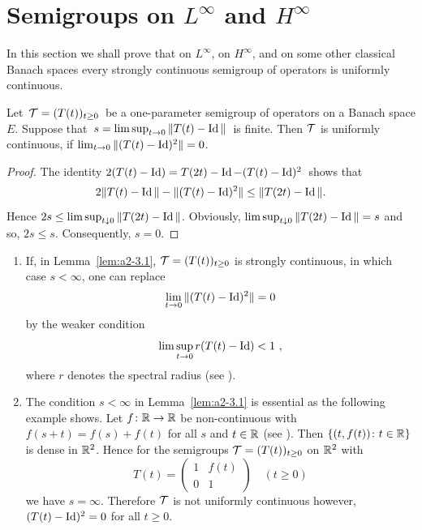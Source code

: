 \section{Semigroups on \texorpdfstring{$L^{\infty}$}{L-infty}  and \texorpdfstring{$H^{\infty}$}{H-infty} \label{sec:a2-3}}%
\hspace{1cm}{\Large by Heinrich P. Lotz}
\vspace{.5cm}
\newline
In this section we shall prove that on $L^\infty$, on $H^\infty$, and on some other classical Banach spaces every strongly continuous semigroup of operators is uniformly continuous.
\begin{lemma}\label{lem:a2-3.1}
Let\, $\TT = (T(t))_{t\geq 0}$\, be a one-parameter semigroup of operators on a Banach space $E$.
Suppose that\, $s = \lim\sup_{t\to 0} \|T(t) - \operatorname{Id}\|$\, is finite.
Then $\mathcal{T}$ is uniformly continuous, if\/ $\lim_{t\to 0} \|(T(t) - \operatorname{Id})^2\| = 0$.
\end{lemma}
\begin{proof}
The identity  $2(T(t) - \operatorname{Id}) = T(2t) - \operatorname{Id} - (T(t) - \operatorname{Id})^2$\, shows that
\[
	2\|T(t) - \Id\| - \|(T(t) - \Id)^{2} \| \leq \|T(2t) - \Id\| .
\]
Hence $2s \leq \lim \sup_{t \downarrow 0} \|T(2t) - \Id\|$.
Obviously, $\lim \sup_{t \downarrow 0} \|T(2t) - \operatorname{Id}\| = s$ and so, $2s \leq s$.
Consequently, $s = 0$.
\end{proof}
\begin{remarks*}\label{rem:a2-3.1-kgk}  
\begin{enumerate}[\upshape (i), wide, labelindent=.25em]
\item \label{rem:a2-3.1-kgk-1}
If, in Lemma~\ref{lem:a2-3.1}, $\TT = (T(t))_{t \geq 0}$ is strongly continuous, in which case 
$s < \infty$, one can replace 
%
\[
	\lim_{t \to 0} \|(T(t) - \operatorname{Id})^2\| = 0
\]
%
by the weaker condition 
\[
\lim \sup_{t \to 0} r(T(t) - \Id) < 1\ ,
\]
where $r$ denotes the spectral radius (see \textcite[Lemma 2]{lotz:1985}).
\item \label{rem:a2-3.1-kgk-2}
The condition $s < \infty$ in Lemma~\ref{lem:a2-3.1}   
is essential as the following example shows.
Let $f \colon \mathbb{R} \to \mathbb{R}$ be non-continuous with $f(s+t) = f(s) + f(t)$ for all $s$ and $t \in \mathbb{R}$ (see \textcite{hamel:1905}).
Then $\{(t,f(t)) \colon t \in \mathbb{R}\}$ is dense in $\mathbb{R}^2$.
Hence for the semigroups $\TT = (T(t))_{t \geq 0}$ on $\mathbb{R}^2$ with
\[
T(t) = \left( \begin{array}{cc}
    1 & f(t) \\
    0 & 1
\end{array} \right) \quad  (t \geq 0)
\]
we have $s = \infty$.
Therefore $\mathcal{T}$ is not uniformly continuous however, $(T(t) - \operatorname{Id})^{2} = 0$ for all $t \geq 0$.
\end{enumerate}
\end{remarks*}
